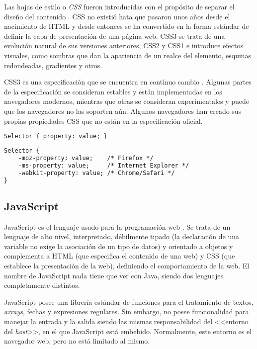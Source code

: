 Las hojas de estilo o \textit{\ac{CSS}} fueron introducidas con el propósito de separar el diseño del contenido \cite{33}. \ac{CSS} no existió hata que pasaron unos años desde el nacimiento de \ac{HTML} y desde entonces se ha convertido en la forma estándar de definir la capa de presentación de una página web. \ac{CSS}3 se trata de una evolución natural de sus versiones anteriores, \ac{CSS}2 y \ac{CSS}1 e introduce efectos visuales, como sombras que dan la apariencia de un realce del elemento, esquinas redondeadas, gradientes y otros.

\ac{CSS}3 es una especificación que se encuentra en contínuo cambio \cite{34}. Algunas partes de la especificación se consideran estables y están implementadas en los navegadores modernos, mientras que otras se consideran experimentales y puede que los navegadores no las soporten aún. Algunos navegadores han creado sus propias propiedades \ac{CSS} que no están en la especificación oficial. 

\begin{lstlisting}[language=html,captionpos=t,caption={\textbf{Sintaxis de una regla en CSS.}},label={lst:cssRule}]
Selector { property: value; }
\end{lstlisting}

\begin{lstlisting}[language=html,captionpos=t,caption={\textbf{Uso de propiedades experimentales en distintos navegadores.}},label={lst:cssExperimental}]
Selector {
    -moz-property: value;    /* Firefox */   
    -ms-property: value;     /* Internet Explorer */
    -webkit-property: value; /* Chrome/Safari */
}
\end{lstlisting}

\subsection{JavaScript}

JavaScript es el lenguaje usado para la programación web \cite{35}. Se trata de un lenguaje de alto nivel, interpretado, débilmente tipado (la declaración de una variable no exige la asociación de un tipo de datos) y orientado a objetos y complementa a \ac{HTML} (que especifica el contenido de una web) y \ac{CSS} (que establece la presentación de la web), definiendo el comportamiento de la web. El nombre de JavaScript nada tiene que ver con Java, siendo dos lenguajes completamente distintos.

JavaScript posee una librería estándar de funciones para el tratamiento de textos, \textit{arrays}, fechas y expresiones regulares. Sin embargo, no posee funcionalidad para manejar la entrada y la salida siendo las mismas responsabilidad del <<entorno del \textit{host}>>, en el que JavaScript está embebido. Normalmente, este entorno es el navegador web, pero no está limitado al mismo. 

